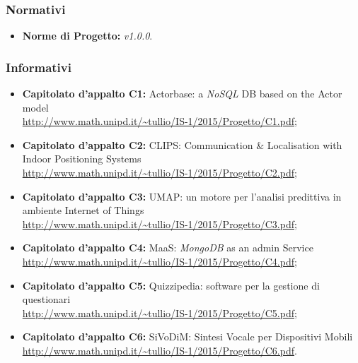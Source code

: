 \subsubsection{Normativi}
\begin{itemize}
\item \textbf{Norme di Progetto:} \textit{\NdP v1.0.0}.
\end{itemize}

\subsubsection{Informativi}
\begin{itemize}
\item \textbf{Capitolato d'appalto C1:} Actorbase: a \textit{NoSQL} DB based on the Actor model
\\\url{http://www.math.unipd.it/~tullio/IS-1/2015/Progetto/C1.pdf};
\item \textbf{Capitolato d'appalto C2:} CLIPS: Communication \& Localisation with Indoor Positioning Systems
\\\url{http://www.math.unipd.it/~tullio/IS-1/2015/Progetto/C2.pdf};
\item \textbf{Capitolato d'appalto C3:} UMAP: un motore per l'analisi predittiva in ambiente Internet of Things
\\\url{http://www.math.unipd.it/~tullio/IS-1/2015/Progetto/C3.pdf};
\item \textbf{Capitolato d'appalto C4:} MaaS: \textit{MongoDB} as an admin Service
\\\url{http://www.math.unipd.it/~tullio/IS-1/2015/Progetto/C4.pdf};
\item \textbf{Capitolato d'appalto C5:} Quizzipedia: software per la gestione di questionari
\\\url{http://www.math.unipd.it/~tullio/IS-1/2015/Progetto/C5.pdf};
\item \textbf{Capitolato d'appalto C6:} SiVoDiM: Sintesi Vocale per Dispositivi Mobili
\\\url{http://www.math.unipd.it/~tullio/IS-1/2015/Progetto/C6.pdf}.
\end{itemize}
